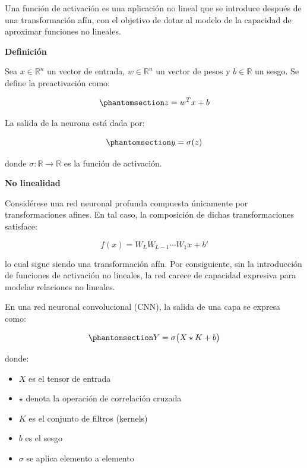 \documentclass[
  spanish,
  us-letterpaper,
]{scrreprt}
\providecommand{\tightlist}{%
  \setlength{\itemsep}{0pt}\setlength{\parskip}{0pt}}
\theoremstyle{definition}
\theoremstyle{remark}
\begin{document}
Una función de activación es una aplicación no lineal que se introduce
después de una transformación afín, con el objetivo de dotar al modelo
de la capacidad de aproximar funciones no lineales.

\textbf{Definición}

Sea \(x \in \mathbb{R}^n\) un vector de entrada, \(w \in \mathbb{R}^n\)
un vector de pesos y \(b \in \mathbb{R}\) un sesgo. Se define la
preactivación como:

\begin{equation}\phantomsection\label{eq-preactivacion}{
z = w^T x + b
}\end{equation}

La salida de la neurona está dada por:

\begin{equation}\phantomsection\label{eq-activacion}{
y = \sigma(z)
}\end{equation}

donde \(\sigma : \mathbb{R} \to \mathbb{R}\) es la función de
activación.

\textbf{No linealidad}

Considérese una red neuronal profunda compuesta únicamente por
transformaciones afines. En tal caso, la composición de dichas
transformaciones satisface:

\[
f(x) = W_L W_{L-1} \cdots W_1 x + b'
\]

lo cual sigue siendo una transformación afín. Por consiguiente, sin la
introducción de funciones de activación no lineales, la red carece de
capacidad expresiva para modelar relaciones no lineales.

En una red neuronal convolucional (CNN), la salida de una capa se
expresa como:

\begin{equation}\phantomsection\label{eq-cnn-activacion}{
Y = \sigma\big( X \star K + b \big)
}\end{equation}

donde:

\begin{itemize}
\tightlist
\item
  \(X\) es el tensor de entrada
\item
  \(\star\) denota la operación de correlación cruzada
\item
  \(K\) es el conjunto de filtros (kernels)
\item
  \(b\) es el sesgo
\item
  \(\sigma\) se aplica elemento a elemento
\end{itemize}
\end{document}

